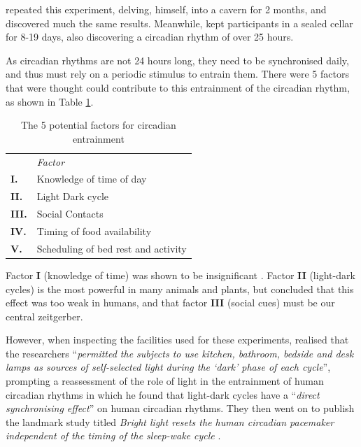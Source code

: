 \citet{siffreTime1964} repeated this experiment, delving, himself, into a cavern for 2 months, and discovered much the same results. Meanwhile, \citet{vonaschoffSpontanperiodikMenschenBei1962} kept participants in a sealed cellar for 8-19 days, also discovering a circadian rhythm of over 25 hours.

As circadian rhythms are not 24 hours long, they need to be synchronised daily, and thus must rely on a periodic stimulus to entrain them. There were 5 factors that were thought could contribute to this entrainment of the circadian rhythm, as shown in Table \ref{Tab:Factors}.

\begin{table}
\caption{The 5 potential factors for circadian entrainment \citep{czeislerEntrainmentHumanOrcadian1981}}
\label{Tab:Factors}
\begin{tabular}{l l}
\hline
 & \textit{Factor} \\
\textbf{I.}& Knowledge of time of day \\
\textbf{II.}& Light Dark cycle \\
\textbf{III.}& Social Contacts \\
\textbf{IV.}& Timing of food availability \\
\textbf{V.}& Scheduling of bed rest and activity \\
\hline
\end{tabular}
\end{table}



Factor \textbf{I} (knowledge of time) was shown to be insignificant \citep{millsCircadianRhythmsThree1964}. Factor \textbf{II} (light-dark cycles) is the most powerful in many animals and plants, but \citet{aschoffHumanCircadianRhythms1971} concluded that this effect was too weak in humans, and that factor \textbf{III} (social cues) must be our central zeitgerber. 

However, when inspecting the facilities used for these experiments, \citet{czeislerEntrainmentHumanOrcadian1981} realised that the researchers ``\textit{permitted the subjects to use kitchen, bathroom, bedside and desk lamps as sources of self-selected light during the `dark' phase of each cycle}'', prompting a reassessment of the role of light in the entrainment of human circadian rhythms in which he found that light-dark cycles have a ``\textit{direct synchronising effect}'' on human circadian rhythms. They then went on to publish the landmark study titled \textit{Bright light resets the human circadian pacemaker independent of the timing of the sleep-wake cycle} \citep{czeislerBrightLightResets1986}.

